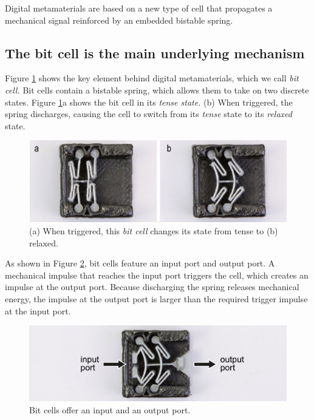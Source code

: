 Digital metamaterials are based on a new type of cell that propagates a mechanical signal reinforced by an embedded bistable spring. 


\subsection{The bit cell is the main underlying mechanism}

Figure \ref{fig:2-bit-cell} shows the key element behind digital metamaterials, which we call \textit{bit cell.} Bit cells contain a bistable spring, which allows them to take on two discrete states. Figure \ref{fig:2-bit-cell}a shows the bit cell in its \textit{tense state.} (b) When triggered, the spring discharges, causing the cell to switch from its \textit{tense} state to its \textit{relaxed} state.  

\begin{figure} [h]
    \includegraphics[width=\textwidth]{chapters/digital-metamaterials-FIG/2-bit-cell.pdf}
    \caption[Short figure name.]{(a) When triggered, this \textit{bit cell} changes its state from tense to (b) relaxed.
    \label{fig:2-bit-cell}}
\end{figure}

As shown in Figure \ref{fig:3-ports-at-cell}, bit cells feature an input port and output port. A mechanical impulse that reaches the input port triggers the cell, which creates an impulse at the output port. Because discharging the spring releases mechanical energy, the impulse at the output port is larger than the required trigger impulse at the input port.

\begin{figure} [h]  
    \includegraphics[width=\textwidth]{chapters/digital-metamaterials-FIG/3-ports-at-cell.pdf}
    \caption[Short figure name.]{Bit cells offer an input and an output port.
    \label{fig:3-ports-at-cell}}
\end{figure}

